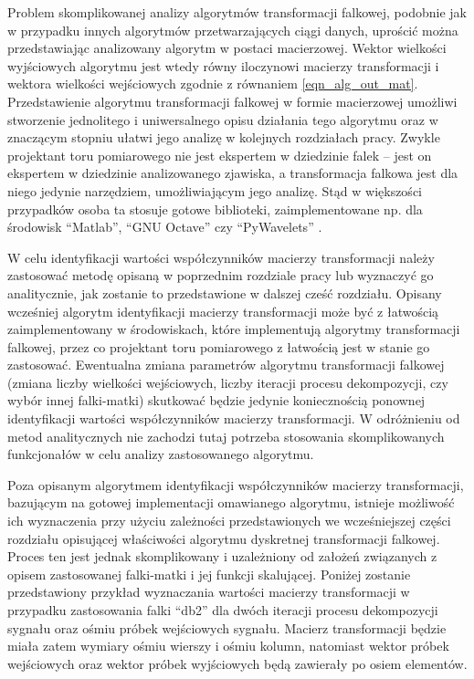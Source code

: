 Problem skomplikowanej analizy algorytmów transformacji falkowej, podobnie jak w przypadku innych algorytmów przetwarzających ciągi danych, uprościć można przedstawiając analizowany algorytm w postaci macierzowej. Wektor wielkości wyjściowych algorytmu jest wtedy równy iloczynowi macierzy transformacji i wektora wielkości wejściowych zgodnie z równaniem \eqref{eqn_alg_out_mat}. Przedstawienie algorytmu transformacji falkowej w formie macierzowej umożliwi stworzenie jednolitego i uniwersalnego opisu działania tego algorytmu oraz w znaczącym stopniu ułatwi jego analizę w kolejnych rozdziałach pracy. Zwykle projektant toru pomiarowego nie jest ekspertem w dziedzinie falek -- jest on ekspertem w dziedzinie analizowanego zjawiska, a transformacja falkowa jest dla niego jedynie narzędziem, umożliwiającym jego analizę. Stąd w większości przypadków osoba ta stosuje gotowe biblioteki, zaimplementowane np. dla środowisk \enquote{Matlab}, \enquote{GNU Octave} czy \enquote{PyWavelets} \cite{lee_pywavelets, misiti_matlabwav}.

W celu identyfikacji wartości współczynników macierzy transformacji należy zastosować metodę opisaną w poprzednim rozdziale pracy lub wyznaczyć go analitycznie, jak zostanie to przedstawione w dalszej cześć rozdziału. Opisany wcześniej algorytm identyfikacji macierzy transformacji może być z łatwością zaimplementowany w środowiskach, które implementują algorytmy transformacji falkowej, przez co projektant toru pomiarowego z łatwością jest w stanie go zastosować. Ewentualna zmiana parametrów algorytmu transformacji falkowej (zmiana liczby wielkości wejściowych, liczby iteracji procesu dekompozycji, czy wybór innej falki-matki) skutkować będzie jedynie koniecznością ponownej identyfikacji wartości współczynników macierzy transformacji. W odróżnieniu od metod analitycznych nie zachodzi tutaj potrzeba stosowania skomplikowanych funkcjonałów w celu analizy zastosowanego algorytmu.

Poza opisanym algorytmem identyfikacji współczynników macierzy transformacji, bazującym na gotowej implementacji omawianego algorytmu, istnieje możliwość ich wyznaczenia przy użyciu zależności przedstawionych we wcześniejszej części rozdziału opisującej właściwości algorytmu dyskretnej transformacji falkowej. Proces ten jest jednak skomplikowany i uzależniony od założeń związanych z opisem zastosowanej falki-matki i jej funkcji skalującej. Poniżej zostanie przedstawiony przykład wyznaczania wartości macierzy transformacji w przypadku zastosowania falki \enquote{db2} dla dwóch iteracji procesu dekompozycji sygnału oraz ośmiu próbek wejściowych sygnału. Macierz transformacji będzie miała zatem wymiary ośmiu wierszy i ośmiu kolumn, natomiast wektor próbek wejściowych oraz wektor próbek wyjściowych będą zawierały po osiem elementów.

